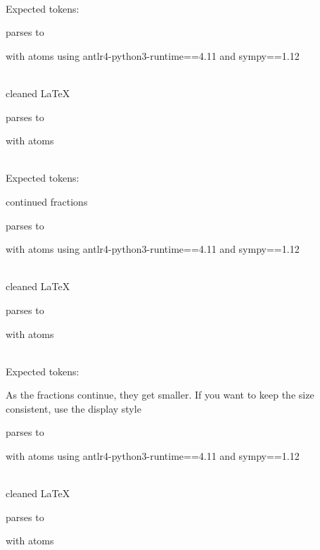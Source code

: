 \documentclass{article}
\begin{document}
\ \\
Expected tokens:



\hrulefill



parses to

with atoms
using antlr4-python3-runtime==4.11 and sympy==1.12

\ \\
cleaned \LaTeX

parses to

with atoms


\ \\
Expected tokens:



\hrulefill

continued fractions
    
parses to

with atoms
using antlr4-python3-runtime==4.11 and sympy==1.12

\ \\
cleaned \LaTeX

parses to

with atoms


\ \\
Expected tokens:



\hrulefill

As the fractions continue, they get smaller. If you want to keep the size consistent, use the display style

parses to

with atoms
using antlr4-python3-runtime==4.11 and sympy==1.12

\ \\
cleaned \LaTeX

parses to

with atoms

\end{document}

